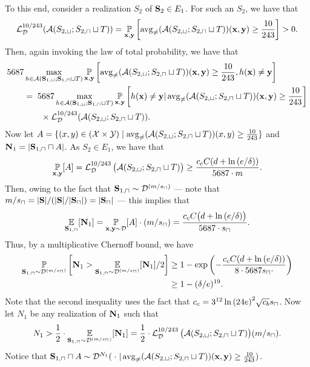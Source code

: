 \begin{proofof}{}
To this end, consider a realization $ S_{2} $ of $ \mathbf{S}_{2}\in E_{1} $.
For such an $ S_{2} $, we have that 
\[ \operatorname{\mathcal{L}}_{\mathcal{D}}^{10/243}(\mathcal{A}(S_{2,\sqcup};S_{2,\sqcap}\sqcup T))= \operatorname*{\mathbb{P}}_{\mathbf{x},\mathbf{y}}\left[\operatorname{\mathrm{avg}_{\not=}}(\mathcal{A}(S_{2,\sqcup};S_{2,\sqcap}\sqcup T))(\mathbf{x},\mathbf{y})\geq \frac{10}{243}\right]>0. \] 
Then, again invoking the law of total probability, we have that 
\begin{align}\label{eq:upperbound1}
    &5687\max_{h\in \mathcal{A}(\mathbf{S}_{1,\sqcup};\mathbf{S}_{1,\sqcap}\sqcup T)}\operatorname*{\mathbb{P}}_{\mathbf{x},\mathbf{y}}\left[ \operatorname{\mathrm{avg}_{\not=}}(\mathcal{A}(S_{2,\sqcup};S_{2,\sqcap}\sqcup T))(\mathbf{x},\mathbf{y})\geq \frac{10}{243}, h(\mathbf{x})\not=\mathbf{y} \right] \nonumber
    \\
 & \qquad = \;
 5687\max_{h\in \mathcal{A}(\mathbf{S}_{1,\sqcup};\mathbf{S}_{1,\sqcap}\sqcup T)}\operatorname*{\mathbb{P}}_{\mathbf{x},\mathbf{y}}\left[h(\mathbf{x})\not=\mathbf{y}|\operatorname{\mathrm{avg}_{\not=}}(\mathcal{A}(S_{2,\sqcup};S_{2,\sqcap}\sqcup T))(\mathbf{x},\mathbf{y})\geq \frac{10}{243}\right] \nonumber \\
 & \qquad \qquad \times 
 \operatorname{\mathcal{L}}_{\mathcal{D}}^{10/243}(\mathcal{A}(S_{2,\sqcup};S_{2,\sqcap}\sqcup T)). 
\end{align}
Now let $ A = \{(x,y)\in(\mathcal{X}\times\mathcal{Y}) \mid \operatorname{\mathrm{avg}_{\not=}}(\mathcal{A}(S_{2,\sqcup};S_{2,\sqcap}\sqcup T))(x,y)\geq \frac{10}{243}\}$ and  $ \mathbf{N}_{1}=|\mathbf{S}_{1,\sqcap}\sqcap A|$.    
As $ S_{2} \in E_{1} $, we have that 
\[ \operatorname*{\mathbb{P}}_{\mathbf{x},\mathbf{y}}[A]=\operatorname{\mathcal{L}}_{\mathcal{D}}^{10/243} \big( \mathcal{A}(S_{2,\sqcup};S_{2,\sqcap}\sqcup T) \big) \geq \frac{c_c C(d+\ln{(e/\delta )})}{5687 \cdot m}. \]
Then, owing to the fact that $ \mathbf{S}_{1,\sqcap}\sim \mathcal{D}^{(m/s_{\sqcap})}$ --- note that $ m/s_{\sqcap}=|\mathbf{S}|/(|\mathbf{S}|/|\mathbf{S}_{\sqcap}|)=|\mathbf{S}_{\sqcap}| $ --- this implies that 
\begin{align*}
    \operatorname*{\mathbb{E}}_{\mathbf{S}_{1,\sqcap}}[\mathbf{N}_{1}]
    =\operatorname*{\mathbb{P}}_{\mathbf{x},\mathbf{y}\sim \mathcal{D}}[A] \cdot (m/s_{\sqcap})
    = \frac{c_c C\big(d+\ln{(e/\delta )}\big)}{5687 \cdot s_{\sqcap}}.
\end{align*} 
Thus, by a multiplicative Chernoff bound, we have
\begin{align}\label{eq:upperbound13}
\operatorname*{\mathbb{P}}_{\mathbf{S}_{1,\sqcap}\sim \mathcal{D}^{(m/s_{\sqcap})}}\left[\mathbf{N}_{1}>\operatorname*{\mathbb{E}}_{\mathbf{S}_{1,\sqcap}\sim \mathcal{D}^{(m/s_{\sqcap})}}[\mathbf{N}_{1}]/2\right] &\geq 1- \exp{\left(-\frac{c_cC(d+\ln{(e/\delta )})}{8\cdot 5687 s_{\sqcap}\cdot}  \right)} \notag \\
&\geq 1-(\delta/e)^{19}. 
\end{align} 
Note that the second inequality uses the fact that $ c_c= 3^{12} \ln{(24e )}^{2}\sqrt{c_b} s_{\sqcap}$.
Now let $ N_{1} $ be any realization of $\mathbf{N}_1$ such that 
\[ N_1 > \frac 12 \cdot  \operatorname*{\mathbb{E}}_{\mathbf{S}_{1,\sqcap}\sim \mathcal{D}^{(m/s_{\sqcap})}}[\mathbf{N}_{1}] = \frac 12 \cdot  \operatorname{\mathcal{L}}_{\mathcal{D}}^{10/243} \big( \mathcal{A}(S_{2,\sqcup};S_{2,\sqcap}\sqcup T) \big) (m/s_{\sqcap}). \]  
Notice that $ \mathbf{S}_{1,\sqcap} \sqcap A \sim \mathcal{D}^{N_{1}}(\; \cdot \; | \operatorname{\mathrm{avg}_{\not=}}(\mathcal{A}(S_{2,\sqcup};S_{2,\sqcap}\sqcup T))(\mathbf{x},\mathbf{y})\geq \frac{10}{243})$. 


\end{proofof}

